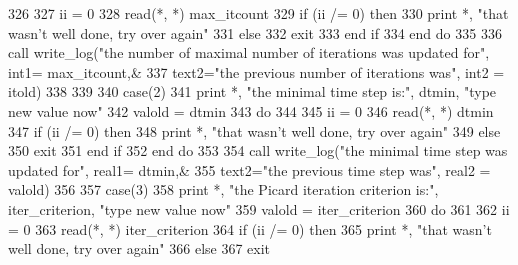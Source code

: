 \begin{DoxyCode}
326 
327                 ii = 0
328                 \textcolor{keyword}{read}(*, *) max_itcount
329                 \textcolor{keywordflow}{if} (ii /= 0) \textcolor{keywordflow}{then}
330                   print *, \textcolor{stringliteral}{"that wasn't well done, try over again"}
331                 \textcolor{keywordflow}{else}
332                   \textcolor{keywordflow}{exit}
333 \textcolor{keywordflow}{                end if}
334 \textcolor{keywordflow}{              end do}
335               
336               \textcolor{keyword}{call }write_log(\textcolor{stringliteral}{"the number of maximal number of iterations was updated for"}\textcolor{comment}{, int1=
      max_itcount,&}
337 \textcolor{comment}{              text2=}\textcolor{stringliteral}{"the previous number of iterations was"}, int2 = itold)
338               
339               
340             \textcolor{keywordflow}{case}(2)
341               print *, \textcolor{stringliteral}{"the minimal time step is:"}, dtmin, \textcolor{stringliteral}{"type new value now"}
342               valold = dtmin
343               \textcolor{keywordflow}{do}
344 
345                 ii = 0
346                 \textcolor{keyword}{read}(*, *) dtmin
347                 \textcolor{keywordflow}{if} (ii /= 0) \textcolor{keywordflow}{then}
348                   print *, \textcolor{stringliteral}{"that wasn't well done, try over again"}
349                 \textcolor{keywordflow}{else}
350                   \textcolor{keywordflow}{exit}
351 \textcolor{keywordflow}{                end if}
352 \textcolor{keywordflow}{              end do}
353                                   
354               \textcolor{keyword}{call }write_log(\textcolor{stringliteral}{"the minimal time step was updated for"}, real1=
      dtmin\textcolor{comment}{,&}
355 \textcolor{comment}{              text2=}\textcolor{stringliteral}{"the previous time step was"}, real2 = valold)
356             
357             \textcolor{keywordflow}{case}(3)
358               print *, \textcolor{stringliteral}{"the Picard iteration criterion is:"}, iter_criterion, \textcolor{stringliteral}{"type new value now"}
359               valold = iter_criterion
360               \textcolor{keywordflow}{do}
361 
362                 ii = 0
363                 \textcolor{keyword}{read}(*, *) iter_criterion
364                 \textcolor{keywordflow}{if} (ii /= 0) \textcolor{keywordflow}{then}
365                   print *, \textcolor{stringliteral}{"that wasn't well done, try over again"}
366                 \textcolor{keywordflow}{else}
367                   \textcolor{keywordflow}{exit}

\end{DoxyCode}
